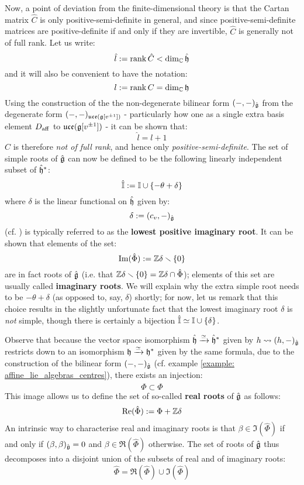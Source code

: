         Now, a point of deviation from the finite-dimensional theory is that the Cartan matrix $\hat{C}$ is only positive-semi-definite in general, and since positive-semi-definite matrices are positive-definite if and only if they are invertible, $\hat{C}$ is generally not of full rank. Let us write:
            $$\hat{l} := \operatorname{rank} \hat{C} < \dim_{\mathbb{C}} \hat{\mathfrak{h}}$$
        and it will also be convenient to have the notation:
            $$l := \operatorname{rank} C = \dim_{\mathbb{C}} \mathfrak{h}$$
        Using the construction of the the non-degenerate bilinear form $(-, -)_{\hat{\mathfrak{g}}}$ from the degenerate form $(-, -)_{\mathfrak{uce}(\mathfrak{g}[v^{\pm 1}])}$ - particularly how one as a single extra basis element $D_{\mathrm{aff}}$ to $\mathfrak{uce}(\mathfrak{g}[v^{\pm 1}])$ - it can be shown that:
            $$\hat{l} = l + 1$$
        $\hat{C}$ is therefore \textit{not of full rank}, and hence only \textit{positive-semi-definite}. The set of simple roots of $\hat{\mathfrak{g}}$ can now be defined to be the following linearly independent subset of $\hat{\mathfrak{h}}^*$:
            $$\hat{\mathbb{I}} := \mathbb{I} \cup \{-\theta + \delta\}$$
        where $\delta$ is the linear functional on $\hat{\mathfrak{h}}$ given by:
            $$\delta := (c_v, -)_{\hat{\mathfrak{g}}}$$
        (cf. \cite[Section 7.4, p. 100]{kac_infinite_dimensional_lie_algebras}) is typically referred to as the \textbf{lowest positive imaginary root}. It can be shown that elements of the set:
            $$\operatorname{Im}(\hat{\Phi}) := \mathbb{Z}\delta \smallsetminus \{0\}$$
        are in fact roots of $\hat{\mathfrak{g}}$ (i.e. that $\mathbb{Z}\delta \smallsetminus \{0\} = \mathbb{Z}\delta \cap \hat{\Phi}$); elements of this set are usually called \textbf{imaginary roots}. We will explain why the extra simple root needs to be $-\theta + \delta$ (as opposed to, say, $\delta$) shortly; for now, let us remark that this choice results in the slightly unfortunate fact that the lowest imaginary root $\delta$ is \textit{not} simple, though there is certainly a bijection $\hat{\mathbb{I}} \simeq \mathbb{I} \cup \{\delta\}$.

        Observe that because the vector space isomorphism $\hat{\mathfrak{h}} \xrightarrow[]{\simeq} \hat{\mathfrak{h}}^*$ given by $h \leadsto (h, -)_{\hat{\mathfrak{g}}}$ restricts down to an isomorphism $\mathfrak{h} \xrightarrow[]{\simeq} \mathfrak{h}^*$ given by the same formula, due to the construction of the bilinear form $(-, -)_{\hat{\mathfrak{g}}}$ (cf. example \ref{example: affine_lie_algebras_centres}), there exists an injection:
            $$\Phi \subset \hat{\Phi}$$
        This image allows us to define the set of so-called \textbf{real roots} of $\hat{\mathfrak{g}}$ as follows:
            $$\operatorname{Re}(\hat{\Phi}) := \Phi + \mathbb{Z}\delta$$
        An intrinsic way to characterise real and imaginary roots is that $\beta \in \Im(\hat{\Phi})$ if and only if $(\beta, \beta)_{\hat{\mathfrak{g}}} = 0$ and $\beta \in \Re(\hat{\Phi})$ otherwise. The set of roots of $\hat{\mathfrak{g}}$ thus decomposes into a disjoint union of the subsets of real and of imaginary roots:
            $$\hat{\Phi} = \Re(\hat{\Phi}) \cup \Im(\hat{\Phi})$$
        
